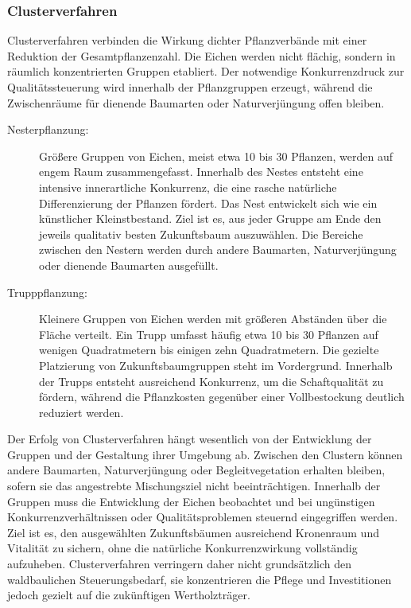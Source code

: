 \documentclass[twocolumn, bibliography=totoc, abstract=true]{scrartcl}
\begin{document}
\subsubsection{Clusterverfahren}

Clusterverfahren verbinden die Wirkung dichter Pflanzverbände mit einer Reduktion der Gesamtpflanzenzahl. Die Eichen werden nicht flächig, sondern in räumlich konzentrierten Gruppen etabliert. Der notwendige Konkurrenzdruck zur Qualitätssteuerung wird innerhalb der Pflanzgruppen erzeugt, während die Zwischenräume für dienende Baumarten oder Naturverjüngung offen bleiben.

\begin{description}
\item[Nesterpflanzung:] Größere Gruppen von Eichen, meist etwa 10 bis 30 Pflanzen, werden auf engem Raum zusammengefasst. Innerhalb des Nestes entsteht eine intensive innerartliche Konkurrenz, die eine rasche natürliche Differenzierung der Pflanzen fördert. Das Nest entwickelt sich wie ein künstlicher Kleinstbestand. Ziel ist es, aus jeder Gruppe am Ende den jeweils qualitativ besten Zukunftsbaum auszuwählen. Die Bereiche zwischen den Nestern werden durch andere Baumarten, Naturverjüngung oder dienende Baumarten ausgefüllt.
\item[Trupppflanzung:] Kleinere Gruppen von Eichen werden mit größeren Abständen über die Fläche verteilt. Ein Trupp umfasst häufig etwa 10 bis 30 Pflanzen auf wenigen Quadratmetern bis einigen zehn Quadratmetern. Die gezielte Platzierung von Zukunftsbaumgruppen steht im Vordergrund. Innerhalb der Trupps entsteht ausreichend Konkurrenz, um die Schaftqualität zu fördern, während die Pflanzkosten gegenüber einer Vollbestockung deutlich reduziert werden.
\end{description}

Der Erfolg von Clusterverfahren hängt wesentlich von der Entwicklung der Gruppen und der Gestaltung ihrer Umgebung ab. Zwischen den Clustern können andere Baumarten, Naturverjüngung oder Begleitvegetation erhalten bleiben, sofern sie das angestrebte Mischungsziel nicht beeinträchtigen. Innerhalb der Gruppen muss die Entwicklung der Eichen beobachtet und bei ungünstigen Konkurrenzverhältnissen oder Qualitätsproblemen steuernd eingegriffen werden. Ziel ist es, den ausgewählten Zukunftsbäumen ausreichend Kronenraum und Vitalität zu sichern, ohne die natürliche Konkurrenzwirkung vollständig aufzuheben. Clusterverfahren verringern daher nicht grundsätzlich den waldbaulichen Steuerungsbedarf, sie konzentrieren die Pflege und Investitionen jedoch gezielt auf die zukünftigen Wertholzträger.
\end{document}
